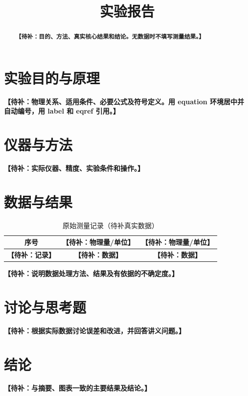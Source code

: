 \documentclass[UTF8,a4paper,zihao=-4]{ctexart}
\title{\pending{实验名称}实验报告}
\author{\pending{姓名、学号}}
\date{\pending{实验日期}}
\newcommand{\pending}[1]{\textbf{【待补：#1】}}
\begin{document}
\maketitle
\justifying
\begin{abstract}
\justifying
\pending{目的、方法、真实核心结果和结论。无数据时不填写测量结果。}
\end{abstract}
\section{实验目的与原理}
\pending{物理关系、适用条件、必要公式及符号定义。用 equation 环境居中并自动编号，用 label 和 eqref 引用。}
\section{仪器与方法}
\pending{实际仪器、精度、实验条件和操作。}
\section{数据与结果}
\begin{table}[htbp]
\centering
\caption{原始测量记录（待补真实数据）}
\label{tab:raw}
\begin{tabular}{ccc}
\toprule
序号 & \pending{物理量/单位} & \pending{物理量/单位} \\
\midrule
\pending{记录} & \pending{数据} & \pending{数据} \\
\bottomrule
\end{tabular}
\end{table}
\pending{说明数据处理方法、结果及有依据的不确定度。}
\section{讨论与思考题}
\pending{根据实际数据讨论误差和改进，并回答讲义问题。}
\section{结论}
\pending{与摘要、图表一致的主要结果及结论。}
\end{document}
